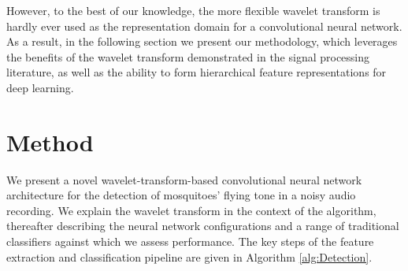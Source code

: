 \documentclass[10pt, twocolumn]{llncs}
\begin{document}
However, to the best of our knowledge, the more flexible wavelet transform is hardly ever used as the representation domain for a convolutional neural network. As a result, in the following section we present our methodology, which leverages the benefits of the wavelet transform demonstrated in the signal processing literature, as well as the ability to form hierarchical feature representations for deep learning.




%
\section{Method}
\label{sec:method}
We present a novel wavelet-transform-based convolutional neural network architecture for the detection of mosquitoes' flying tone in a noisy audio recording. We explain the wavelet transform in the context of the algorithm, thereafter describing the neural network configurations and a range of traditional classifiers against which we assess performance. The key steps of the feature extraction and classification pipeline are given in Algorithm \ref{alg:Detection}.  
\end{document}
